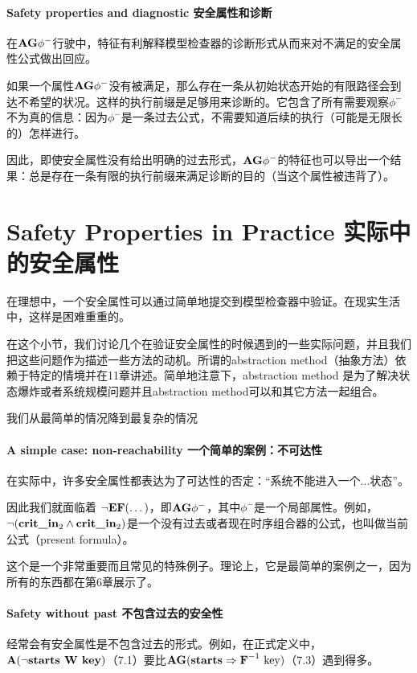 \documentclass{book}
\begin{document}
    \paragraph{Safety properties and diagnostic 安全属性和诊断} 在$\text{\textbf{AG}}\phi^-$行驶中，特征有利解释模型检查器的诊断形式从而来对不满足的安全属性公式做出回应。

    如果一个属性$\text{\textbf{AG}}\phi^-$没有被满足，那么存在一条从初始状态开始的有限路径会到达不希望的状况。这样的执行前缀是足够用来诊断的。它包含了所有需要观察$\phi^-$不为真的信息：因为$\phi^-$是一条过去公式，不需要知道后续的执行（可能是无限长的）怎样进行。

    因此，即使安全属性没有给出明确的过去形式，$\text{\textbf{AG}}\phi^-$的特征也可以导出一个结果：总是存在一条有限的执行前缀来满足诊断的目的（当这个属性被违背了）。

    \section{Safety Properties in Practice 实际中的安全属性}
    在理想中，一个安全属性可以通过简单地提交到模型检查器中验证。在现实生活中，这样是困难重重的。

    在这个小节，我们讨论几个在验证安全属性的时候遇到的一些实际问题，并且我们把这些问题作为描述一些方法的动机。所谓的abstraction method（抽象方法）依赖于特定的情境并在11章讲述。简单地注意下，abstraction method 是为了解决状态爆炸或者系统规模问题并且abstraction method可以和其它方法一起组合。

    我们从最简单的情况降到最复杂的情况

    \paragraph{A simple case: non-reachability 一个简单的案例：不可达性} 在实际中，许多安全属性都表达为了可达性的否定：“系统不能进入一个...状态”。

    因此我们就面临着 $\neg\text{\textbf{EF}}(\dots)$，即$\text{\textbf{AG}}\phi^-$，其中$\phi^-$是一个局部属性。例如，$\neg(\text{\textbf{crit\_in}} _2\wedge\text{\textbf{crit\_in}}_2)$是一个没有过去或者现在时序组合器的公式，也叫做当前公式（present formula）。

    这个是一个非常重要而且常见的特殊例子。理论上，它是最简单的案例之一，因为所有的东西都在第6章展示了。

    \paragraph{Safety without past 不包含过去的安全性} 经常会有安全属性是不包含过去的形式。例如，在正式定义中， $\text{\textbf{A}}(\neg\text{\textbf{starts W key}})$（7.1）要比$ \text{\textbf{AG}}(\text{\textbf{starts}}\Rightarrow \text{\textbf{F}}^{-1} \text{ key} )$（7.3）遇到得多。
\end{document}
